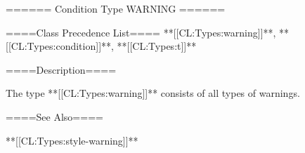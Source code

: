 ====== Condition Type WARNING ======

====Class Precedence List==== **[[CL:Types:warning]]**, **[[CL:Types:condition]]**, **[[CL:Types:t]]**

====Description====

The type **[[CL:Types:warning]]** consists of all types of warnings.

====See Also====

**[[CL:Types:style-warning]]**

